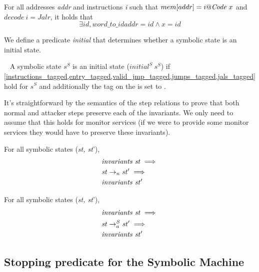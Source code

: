 \begin{definition}\label{jals_tagged}
  For all addresses \textit{addr} and instructions \textit{i} such
  that $\rd{mem}{addr}=i@\INSTR{x}$ and $decode~i = Jal r$, it holds that
  $$\exists id, word\_to\_id addr = id \land x = id$$
\end{definition}

We define a predicate \emph{initial} that determines whether a symbolic
state is an initial state.

\begin{definition}\label{symbolic_initial_pred}
  ~ A symbolic state $s^S$ is an initial state ($initial^S ~ s^S$) if
  \cref{instructions_tagged,entry_tagged,valid_jmp_tagged,jumps_tagged,jals_tagged}
  hold for $s^S$ and additionally the tag on the \pc is set to
  \DATAname.
\end{definition}

It's straightforward by the semantics of the step relations to prove
that both normal and attacker steps preserve each of the invariants.
We only need to assume that this holds for monitor services (\IE if we
were to provide some monitor services they would have to preserve
these invariants).

\begin{lemma}
\label{step_preserves_invariants}
For all symbolic states (\textit{st, st}'),
\begin{align*}
  & \mathit{invariants}~\mathit{st} \implies \\
  & \stepn{\mathit{st}}{\mathit{st}'} \implies \\
  & \mathit{invariants}~\mathit{st}'
\end{align*}
\end{lemma}

\begin{lemma}
\label{step_a_preserves_invariants}
For all symbolic states (\textit{st, st}'),
\begin{align*}
  & \mathit{invariants}~\mathit{st} \implies \\
  & \stepa{\mathit{st}}{\mathit{st}'}{S} \implies \\
  & \mathit{invariants}~\mathit{st}'
\end{align*}
\end{lemma}

\subsection{Stopping predicate for the Symbolic Machine}
\label{sec:symbolic_stopping}

